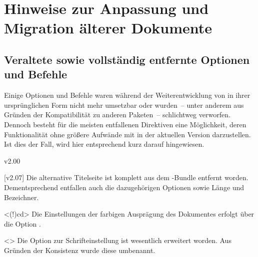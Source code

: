 \chapter{Hinweise zur Anpassung und Migration älterer Dokumente}
\section{%
  Veraltete sowie vollständig entfernte Optionen und Befehle%
  \label{sec:cessations}%
}
%
\begin{Entity}{}
\begin{NoIndexDefault}
Einige Optionen und Befehle waren während der Weiterentwicklung von \TUDScript
in ihrer ursprünglichen Form nicht mehr umsetzbar oder wurden~-- unter anderem 
aus Gründen der Kompatibilität zu anderen Paketen~-- schlichtweg verworfen. 
Dennoch besteht für die meisten entfallenen Direktiven eine Möglichkeit, deren 
Funktionalität ohne größere Aufwände mit \TUDScript in der aktuellen Version 
\vTUDScript{} darzustellen. Ist dies der Fall, wird hier entsprechend kurz 
darauf hingewiesen.



\begin{Cessations}{v2.00}
\begin{Cessation}
  {}
\begin{Cessation}
  {}
\begin{Cessation}
  {}
\begin{Cessation}
  {}
\printdeclarationlist
%
[v2.07]%
Die alternative Titelseite ist komplett aus dem \TUDScript-Bundle entfernt 
worden. Dementsprechend entfallen auch die dazugehörigen Optionen sowie Länge 
und Bezeichner.
\end{Cessation}
\end{Cessation}
\end{Cessation}
\end{Cessation}

\begin{Cessation}
  {}
  <\Option(!){cd}>
\printdeclarationlist
%
Die Einstellungen der farbigen Ausprägung des Dokumentes erfolgt über die 
Option .
\end{Cessation}

\begin{Cessation}
  {}
  <>
\printdeclarationlist
%
Die Option zur Schrifteinstellung ist wesentlich erweitert worden. Aus Gründen 
der Konsistenz wurde diese umbenannt.
\end{Cessation}


\end{Cessations}
\end{NoIndexDefault}
\end{Entity}
